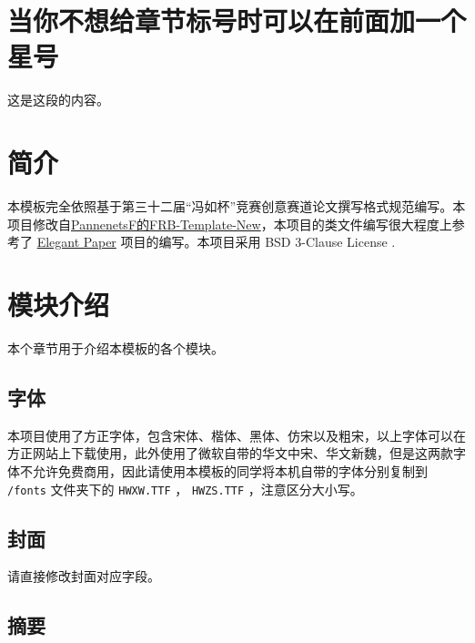 \documentclass[lang=cn,12pt]{frbpaper}
\begin{document}
\clearpage




\makemain

\section*{当你不想给章节标号时可以在前面加一个星号}

这是这段的内容。

\section{简介}

本模板完全依照基于第三十二届“冯如杯”竞赛创意赛道论文撰写格式规范编写。本项目修改自\href{https://github.com/PannenetsF/FRB-Template-New}{PannenetsF的FRB-Template-New}，本项目的类文件编写很大程度上参考了 \href{https://github.com/ElegantLaTeX/ElegantPaper}{Elegant Paper} 项目的编写。本项目采用  BSD 3-Clause License .

\section{模块介绍}

本个章节用于介绍本模板的各个模块。

\subsection{字体}

本项目使用了方正字体，包含宋体、楷体、黑体、仿宋以及粗宋，以上字体可以在方正网站上下载使用，此外使用了微软自带的华文中宋、华文新魏，但是这两款字体不允许免费商用，因此请使用本模板的同学将本机自带的字体分别复制到  \lstinline{/fonts} 文件夹下的 \lstinline{HWXW.TTF} ， \lstinline{HWZS.TTF} ，注意区分大小写。

\subsection{封面}

请直接修改封面对应字段。

\subsection{摘要}
\end{document}
